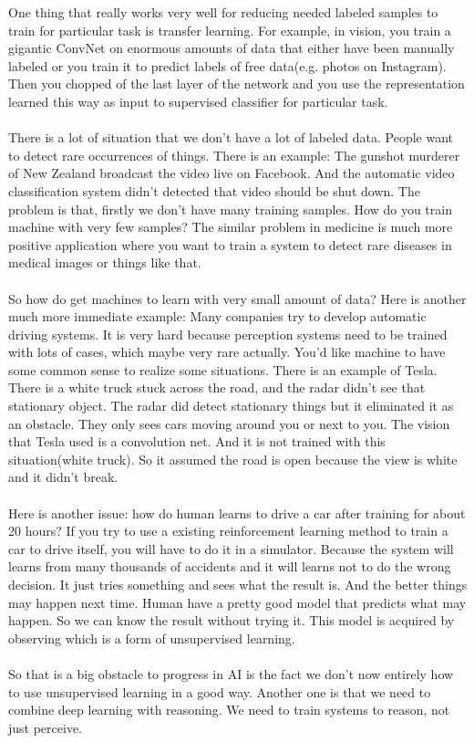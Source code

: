 \documentclass{article}
\begin{document}
One thing that really works very well for reducing needed labeled samples to train for particular task is transfer learning. For example, in vision, you train a gigantic ConvNet on enormous amounts of data that either have been manually labeled or you train it to predict labels of free data(e.g. photos on Instagram). Then you chopped of the last layer of the network and you use the representation learned this way as input to supervised classifier for particular task. \\ \\

There is a lot of situation that we don't have a lot of labeled data. People want to detect rare occurrences of things. There is an example: The gunshot murderer of New Zealand broadcast the video live on Facebook. And the automatic video classification system didn't detected that video should be shut down. The problem is that, firstly we don't have many training samples. How do you train machine with very few samples? The similar problem in medicine is much more positive application where you want to train a system to detect rare diseases in medical images or things like that.\\ \\

So how do get machines to learn with very small amount of data? Here is another much more immediate example: Many companies try to develop automatic driving systems. It is very hard because perception systems need to be trained with lots of cases, which maybe very rare actually. You'd like machine to have some common sense to realize some situations. There is an example of Tesla. There is a white truck stuck across the road, and the radar didn't see that stationary object. The radar did detect stationary things but it eliminated it as an obstacle. They only sees cars moving around you or next to you. The vision that Tesla used is a convolution net. And it is not trained with this situation(white truck). So it assumed the road is open because the view is white and it didn't break.\\ \\

Here is another issue: how do human learns to drive a car after training for about 20 hours? If you try to use a existing reinforcement learning method to train a car to drive itself, you will have to do it in a simulator. Because the system will learns from many thousands of accidents and it will learns not to do the wrong decision. It just tries something and sees what the result is. And the better things may happen next time. Human have a pretty good model that predicts what may happen. So we can know the result without trying it. This model is acquired by observing which is a form of unsupervised learning.\\ \\
So that is a big obstacle to progress in AI is the fact we don't now entirely how to use unsupervised learning in a good way. Another one is that we need to combine deep learning with reasoning. We need to train systems to reason, not just perceive. \\ \\
\end{document}
